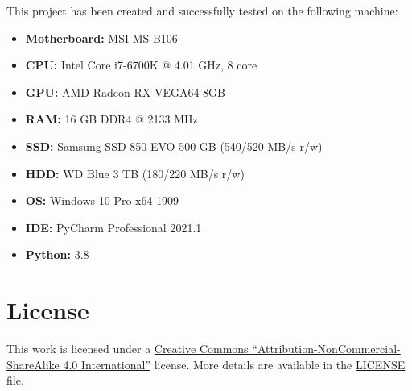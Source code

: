 \documentclass[11pt]{article}
\providecommand{\tightlist}{%
      \setlength{\itemsep}{0pt}\setlength{\parskip}{0pt}}
\begin{document}
This project has been created and successfully tested on the following
machine:

\begin{itemize}
\tightlist
\item
  \textbf{Motherboard:} MSI MS-B106
\item
  \textbf{CPU:} Intel Core i7-6700K @ 4.01 GHz, 8 core
\item
  \textbf{GPU:} AMD Radeon RX VEGA64 8GB
\item
  \textbf{RAM:} 16 GB DDR4 @ 2133 MHz
\item
  \textbf{SSD:} Samsung SSD 850 EVO 500 GB (540/520 MB/s r/w)
\item
  \textbf{HDD:} WD Blue 3 TB (180/220 MB/s r/w)
\item
  \textbf{OS:} Windows 10 Pro x64 1909
\item
  \textbf{IDE:} PyCharm Professional 2021.1
\item
  \textbf{Python:} 3.8
\end{itemize}

\section{License}\label{license}

This work is licensed under a
\href{https://creativecommons.org/licenses/by-nc-sa/4.0/deed.en}{Creative
Commons ``Attribution-NonCommercial-ShareAlike 4.0 International''}
license. More details are available in the \href{./LICENSE}{LICENSE}
file.

\printbibliography[
heading=bibintoc,
title={References}]

    
    
    
\end{document}
